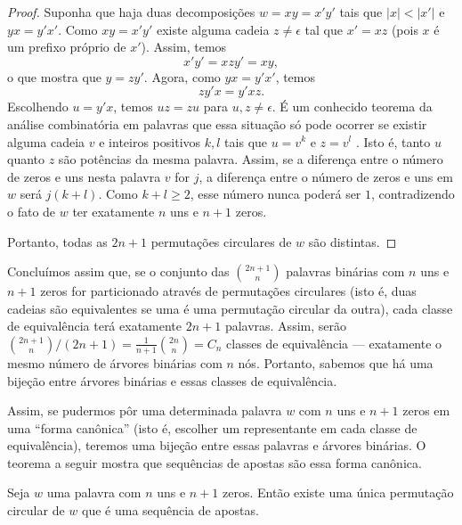 \begin{proof}
    Suponha que haja duas decomposições $w = xy = x'y'$
    tais que $|x| < |x'|$ e $yx = y'x'$.
    Como $xy = x'y'$
    existe alguma cadeia $z \neq \epsilon$
    tal que $x' = xz$
    (pois $x$ é um prefixo próprio de $x'$).
    Assim, temos
    \begin{equation*}
        x'y' = xzy' = xy,
    \end{equation*}
    o que mostra que $y = zy'$.
    Agora,
    como $yx = y'x'$,
    temos
    \begin{equation*}
        zy'x = y'xz.
    \end{equation*}
    Escolhendo $u = y'x$, temos $uz = zu$
    para $u, z \neq \epsilon$.
    É um conhecido teorema da análise combinatória em palavras
    que essa situação só pode ocorrer se
    existir alguma cadeia $v$ e inteiros positivos $k, l$ tais que
    $u = v^k$ e $z = v^l$ \cite[p.~32]{Shallit2008}.
    Isto é, tanto $u$ quanto $z$ são potências da mesma palavra.
    Assim,
    se a diferença entre o número de zeros e uns nesta palavra $v$ for $j$,
    a diferença entre o número de zeros e uns em $w$ será $j(k + l)$.
    Como $k + l \geq 2$,
    esse número nunca poderá ser $1$,
    contradizendo o fato de $w$ ter exatamente $n$ uns e $n+1$ zeros.

    Portanto, todas as $2n+1$ permutações circulares de $w$ são distintas.
\end{proof}

Concluímos assim que,
se o conjunto das $\binom{2n+1}{n}$ palavras binárias com $n$ uns e $n+1$ zeros
for particionado através de permutações circulares
(isto é, duas cadeias são equivalentes se uma é uma permutação circular da outra),
cada classe de equivalência terá exatamente $2n+1$ palavras.
Assim,
serão $\binom{2n+1}{n}/(2n+1) = \frac{1}{n+1} \binom{2n}{n} = C_n$
classes de equivalência
--- exatamente o mesmo número de árvores binárias com $n$ nós.
Portanto,
sabemos que há uma bijeção entre árvores binárias e essas classes de equivalência.

Assim,
se pudermos pôr uma determinada palavra $w$ com $n$ uns e $n+1$ zeros
em uma ``forma canônica''
(isto é, escolher um representante em cada classe de equivalência),
teremos uma bijeção entre essas palavras e árvores binárias.
O teorema a seguir mostra que
sequências de apostas são essa forma canônica.

\begin{lemma}
    Seja $w$ uma palavra com $n$ uns e $n+1$ zeros.
    Então existe uma única permutação circular de $w$
    que é uma sequência de apostas.
\end{lemma}

